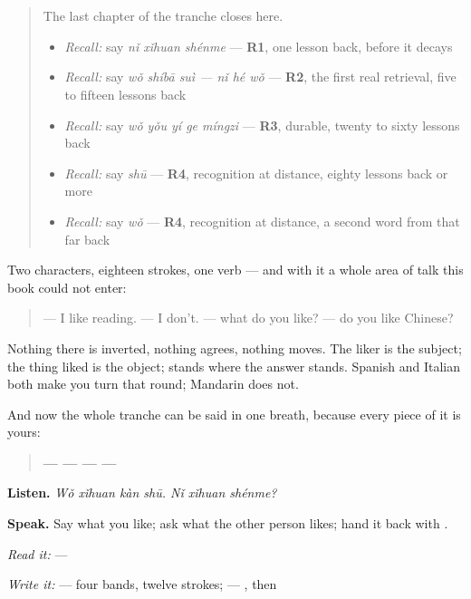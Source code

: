 \section[Practice]{}

\label{lesson:ZH-C28-practice}



\begin{quote}
The last chapter of the tranche closes here.

\begin{itemize}
\raggedright
  \item \emph{Recall:} say \emph{nǐ xǐhuan shénme} — \textbf{R1}, one lesson back, before it decays
  \item \emph{Recall:} say \emph{wǒ shíbā suì — nǐ hé wǒ} — \textbf{R2}, the first real retrieval, five to fifteen lessons back
  \item \emph{Recall:} say \emph{wǒ yǒu yí ge míngzi} — \textbf{R3}, durable, twenty to sixty lessons back
  \item \emph{Recall:} say \emph{shū} — \textbf{R4}, recognition at distance, eighty lessons back or more
  \item \emph{Recall:} say \emph{wǒ} — \textbf{R4}, recognition at distance, a second word from that far back
\end{itemize}
\end{quote}

\begin{grammarlens}[title={What you've built — liking, said plainly}]
Two characters, eighteen strokes, one verb — and with it a whole area of talk this book could not enter:

\begin{quote}
\textbf{} — I like reading. \textbf{} — I don't. \textbf{} — what do you like? \textbf{} — do you like Chinese?
\end{quote}

Nothing there is inverted, nothing agrees, nothing moves. The liker is the subject; the thing liked is the object;  stands where the answer stands. Spanish and Italian both make you turn that round; Mandarin does not.

And now the whole tranche can be said in one breath, because every piece of it is yours:

\begin{quote}
\textbf{ —  —  —  — }
\end{quote}

\textbf{Listen.} \emph{Wǒ xǐhuan kàn shū. Nǐ xǐhuan shénme?}

\textbf{Speak.} Say what you like; ask what the other person likes; hand it back with .

\emph{Read it:}  — 

\emph{Write it:}  — four bands, twelve strokes;  — , then 
\end{grammarlens}

